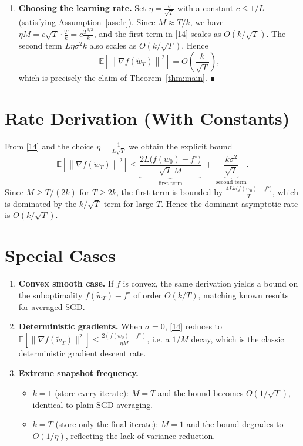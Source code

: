 \documentclass{article}
\newcommand{\E}{\mathbb{E}}
\newcommand{\norm}[1]{\left\|#1\right\|}
\begin{document}
\begin{enumerate}
\item[Step 7.] \textbf{Choosing the learning rate.}  
Set $\eta=\frac{c}{\sqrt{T}}$ with a constant $c\le 1/L$ (satisfying Assumption~\ref{ass:lr}). Since $M\approx T/k$, we have $\eta M = c\sqrt{T}\cdot \frac{T}{k}=c\frac{T^{3/2}}{k}$, and the first term in \eqref{14} scales as $O(k/\sqrt{T})$. The second term $L\eta\sigma^2 k$ also scales as $O(k/\sqrt{T})$. Hence
\[
\E\!\left[\norm{\nabla f(\tilde w_T)}^2\right]=O\!\left(\frac{k}{\sqrt{T}}\right),
\]
which is precisely the claim of Theorem~\ref{thm:main}. ∎
\end{enumerate}

\section*{Rate Derivation (With Constants)}
From \eqref{14} and the choice $\eta=\frac{1}{L\sqrt{T}}$ we obtain the explicit bound
\[
\E\!\left[\norm{\nabla f(\tilde w_T)}^2\right]
\le
\underbrace{\frac{2L\big(f(w_0)-f^\star\big)}{ \sqrt{T}\,M}}_{\displaystyle
\text{first term}}
\;+\;
\underbrace{\frac{k\sigma^2}{\sqrt{T}}}_{\displaystyle\text{second term}} .
\]
Since $M\ge T/(2k)$ for $T\ge 2k$, the first term is bounded by $\frac{4Lk\big(f(w_0)-f^\star\big)}{T}$, which is dominated by the $k/\sqrt{T}$ term for large $T$. Hence the dominant asymptotic rate is $O(k/\sqrt{T})$.

\section*{Special Cases}
\begin{enumerate}
\item \textbf{Convex smooth case.} If $f$ is convex, the same derivation yields a bound on the suboptimality $f(\tilde w_T)-f^\star$ of order $O(k/T)$, matching known results for averaged SGD.
\item \textbf{Deterministic gradients.} When $\sigma=0$, \eqref{14} reduces to $\E[\|\nabla f(\tilde w_T)\|^2]\le \frac{2(f(w_0)-f^\star)}{\eta M}$, i.e. a $1/M$ decay, which is the classic deterministic gradient descent rate.
\item \textbf{Extreme snapshot frequency.}
    \begin{itemize}
    \item $k=1$ (store every iterate): $M=T$ and the bound becomes $O(1/\sqrt{T})$, identical to plain SGD averaging.
    \item $k=T$ (store only the final iterate): $M=1$ and the bound degrades to $O(1/\eta)$, reflecting the lack of variance reduction.
    \end{itemize}
\end{enumerate}
\end{document}
